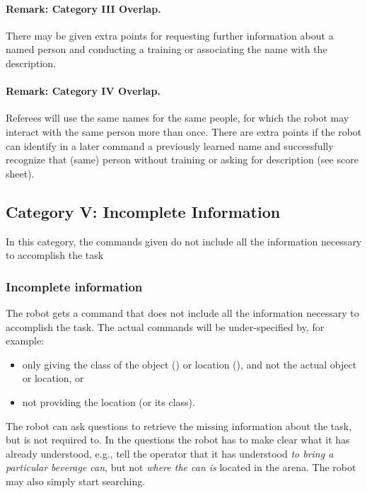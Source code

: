 \paragraph{Remark: Category III Overlap.} There may be given extra points for requesting further information about a named person and conducting a training or associating the name with the description.

\paragraph{Remark: Category IV Overlap.} Referees will use the same names for the same people, for which the robot may interact with the same person more than once. There are extra points if the robot can identify in a later command a previously learned name and successfully recognize that (same) person without training or asking for description (see score sheet).


%
%
\subsection{Category V: Incomplete
Information}
\label{sec:eegpsr-category5-explained}
In this category, the commands given do not include all the information necessary to accomplish the task

\subsubsection{Incomplete information}
The robot gets a command that does not include all the information necessary to accomplish the task. The actual commands will be under-specified by, for example:
\begin{itemize}
	\item only giving the class of the object () or location (), and not the actual object or location, or
	\item not providing the location (or its class).
\end{itemize}

The robot can ask questions to retrieve the missing information about the task, but is not required to. In the questions the robot has to make clear what it has already understood, e.g., tell the operator that it has understood \textit{to bring a particular beverage can}, but not \textit{where the can is} located in the arena. The robot may also simply start searching.

